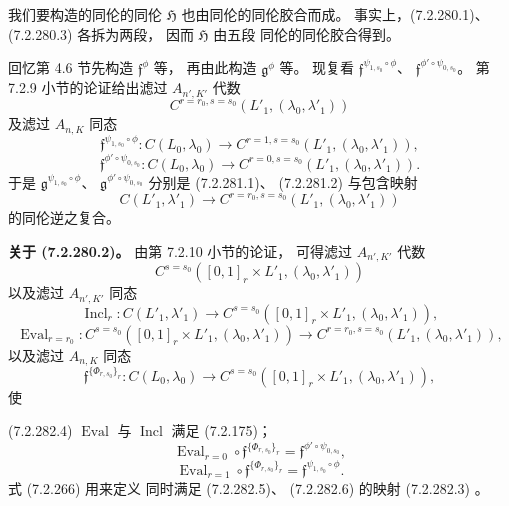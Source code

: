我们要构造的同伦的同伦
$\mathfrak H$ 也由同伦的同伦胶合而成。
事实上，(7.2.280.1)、
(7.2.280.3) 各拆为两段，
因而 $\mathfrak H$ 由五段
同伦的同伦胶合得到。

回忆第 4.6 节先构造
$\mathfrak f^\phi$ 等，
再由此构造 $\mathfrak g^\phi$ 等。
现复看
$\mathfrak f^{\psi_{1,s_0}\circ\phi}$、
$\mathfrak f^{\phi'\circ\psi_{0,s_0}}$。
第 7.2.9 小节的论证给出滤过
$A_{n',K'}$ 代数
\[
C^{r=r_0,s=s_0}
(L'_1,(\lambda_0,\lambda'_1))
\]
及滤过 $A_{n,K}$ 同态
\begin{equation}
\mathfrak f^{\psi_{1,s_0}\circ\phi}\colon
C(L_0,\lambda_0)\longrightarrow
C^{r=1,s=s_0}(L'_1,(\lambda_0,\lambda'_1)),
\tag{7.2.281.1}\label{eq:7-2-281-1}
\end{equation}
\begin{equation}
\mathfrak f^{\phi'\circ\psi_{0,s_0}}\colon
C(L_0,\lambda_0)\longrightarrow
C^{r=0,s=s_0}(L'_1,(\lambda_0,\lambda'_1)).
\tag{7.2.281.2}\label{eq:7-2-281-2}
\end{equation}
于是
$\mathfrak g^{\psi_{1,s_0}\circ\phi}$、
$\mathfrak g^{\phi'\circ\psi_{0,s_0}}$
分别是 (7.2.281.1)、
(7.2.281.2) 与包含映射
\[
C(L'_1,\lambda'_1)
\longrightarrow
C^{r=r_0,s=s_0}
(L'_1,(\lambda_0,\lambda'_1))
\]
的同伦逆之复合。

\par\noindent\textbf{关于 (7.2.280.2)。}
由第 7.2.10 小节的论证，
可得滤过 $A_{n',K'}$ 代数
\[
C^{s=s_0}
([0,1]_r\times L'_1,(\lambda_0,\lambda'_1))
\]
以及滤过 $A_{n',K'}$ 同态
\begin{equation}
\operatorname{Incl}_r\colon
C(L'_1,\lambda'_1)\longrightarrow
C^{s=s_0}
([0,1]_r\times L'_1,(\lambda_0,\lambda'_1)),
\tag{7.2.282.1}\label{eq:7-2-282-1}
\end{equation}
\begin{equation}
\operatorname{Eval}_{r=r_0}\colon
C^{s=s_0}
([0,1]_r\times L'_1,(\lambda_0,\lambda'_1))
\longrightarrow
C^{r=r_0,s=s_0}
(L'_1,(\lambda_0,\lambda'_1)),
\tag{7.2.282.2}\label{eq:7-2-282-2}
\end{equation}
以及滤过 $A_{n,K}$ 同态
\begin{equation}
\mathfrak f^{\{\Phi_{r,s_0}\}_r}\colon
C(L_0,\lambda_0)\longrightarrow
C^{s=s_0}
([0,1]_r\times L'_1,(\lambda_0,\lambda'_1)),
\tag{7.2.282.3}\label{eq:7-2-282-3}
\end{equation}
使
\par\noindent\textup{(7.2.282.4)}
$\operatorname{Eval}$ 与
$\operatorname{Incl}$ 满足 (7.2.175)；
\begin{equation}
\operatorname{Eval}_{r=0}\circ
\mathfrak f^{\{\Phi_{r,s_0}\}_r}
=\mathfrak f^{\phi'\circ\psi_{0,s_0}},
\tag{7.2.282.5}\label{eq:7-2-282-5}
\end{equation}
\begin{equation}
\operatorname{Eval}_{r=1}\circ
\mathfrak f^{\{\Phi_{r,s_0}\}_r}
=\mathfrak f^{\psi_{1,s_0}\circ\phi}.
\tag{7.2.282.6}\label{eq:7-2-282-6}
\end{equation}
式 (7.2.266) 用来定义
同时满足 (7.2.282.5)、
(7.2.282.6) 的映射 (7.2.282.3)
。

